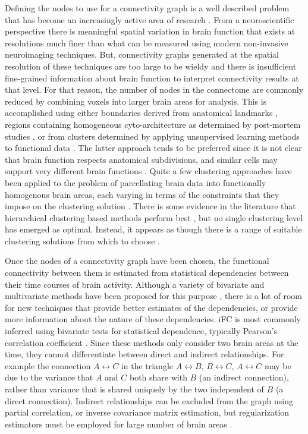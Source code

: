 \documentclass{bmcart}
\begin{document}
Defining the nodes to use for a connectivity graph is a well described problem that has become an increasingly active area of research \cite{Thirion2014}. From a neuroscientific perspective there is meaningful spatial variation in brain function that exists at resolutions much finer than what can be measured using modern non-invasive neuroimaging techniques. But, connectivity graphs generated at the spatial resolution of these techniques are too large to be wieldy and there is insufficient fine-grained information about brain function to interpret connectivity results at that level. For that reason, the number of nodes in the connectome are commonly reduced by combining voxels into larger brain areas for analysis. This is accomplished using either boundaries derived from anatomical landmarks \cite{Desikan2006,AAL2002}, regions containing homogeneous cyto-architecture as determined by post-mortem studies \cite{Eickhoff2008}, or from clusters determined by applying unsupervised learning methods to functional data \cite{Bellec2006,Craddock2012}. The latter approach tends to be preferred since it is not clear that brain function respects anatomical subdivisions, and similar cells may support very different brain functions \cite{Craddock2012}. Quite a few clustering approaches have been applied to the problem of parcellating brain data into functionally homogenous brain areas, each varying in terms of the constraints that they impose on the clustering solution  \cite{Craddock2012,Blumensath2013,Bellec2006,Thirion2006,Zalesky2010,Flandin2002,Thirion2014}. There is some evidence in the literature that hierarchical clustering based methods perform best \cite{Blumensath2013,Thirion2014}, but no single clustering level has emerged as optimal. Instead, it appears as though there is a range of suitable clustering solutions from which to choose  \cite{Craddock2012,Thirion2014}.  

Once the nodes of a connectivity graph have been chosen, the functional connectivity between them is estimated from statistical dependencies between their time courses of brain activity. Although a variety of bivariate and multivariate methods have been proposed for this purpose \cite{Smith2011,Varoquaux2013}, there is a lot of room for new techniques that provide better estimates of the dependencies, or provide more information about the nature of these dependencies. iFC is most commonly inferred using bivariate tests for statistical dependence, typically Pearson's correlation coefficient \cite{Biswal1995}. Since these methods only consider two brain areas at the time, they cannot differentiate between direct and indirect relationships. For example the connection $A \leftrightarrow C$ in the triangle $A \leftrightarrow B$, $B \leftrightarrow C$, $A \leftrightarrow C$ may be due to the variance that $A$ and $C$ both share with $B$ (an indirect connection), rather than variance that is shared uniquely by the two independent of $B$ (a direct connection). Indirect relationships can be excluded from the graph using partial correlation, or inverse covariance matrix estimation, but regularization estimators must be employed for large number of brain areas \cite{Ryali2012,Varoquaux2013}. 
\end{document}
